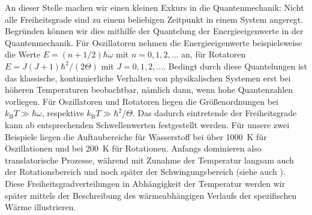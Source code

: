 An dieser Stelle machen wir einen kleinen Exkurs in die Quantenmechanik:
Nicht alle Freiheitsgrade sind zu einem beliebigen Zeitpunkt in einem System angeregt. Begründen können wir dies mithilfe der Quantelung der Energieeigenwerte in der Quantenmechanik.
Für Oszillatoren nehmen die Energieeigenwerte beispielsweise die Werte $E=(n+1/2)\hbar\omega$ mit $n=0,1,2,\ldots$ an, für Rotatoren $E=J(J+1)\hbar^2/(2\Theta)$ mit $J=0,1,2,\ldots$.
Bedingt durch diese Quantelungen ist das klassische, kontinuierliche Verhalten von physikalischen Systemen erst bei höheren Temperaturen beobachtbar, nämlich dann, wenn hohe Quantenzahlen vorliegen. Für Oszillatoren und Rotatoren liegen die Größenordnungen bei $k_\mathrm{B}T\gg\hbar\omega $, respektive $k_\mathrm{B}T\gg\hbar^2/\Theta$.
Das dadurch eintretende  der Freiheitsgrade kann ab entsprechenden Schwellenwerten festgestellt werden. Für unsere zwei Beispiele liegen die Auftaubereiche für Wasserstoff bei über \qty{1000}{\kelvin} für Oszillationen und bei \qty{200}{\kelvin} für Rotationen.
Anfangs dominieren also translatorische Prozesse, während mit Zunahme der Temperatur langsam auch der Rotationsbereich und noch später der Schwingungsbereich  (siehe auch ).
Diese Freiheitsgradverteilungen in Abhängigkeit der Temperatur werden wir später mittels der Beschreibung des wärmeabhängigen Verlaufs der spezifischen Wärme illustrieren.

